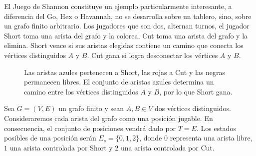 	El Juego de Shannon constituye un ejemplo particularmente interesante, a diferencia del Go, Hex o Havannah, no se desarrolla sobre un tablero, sino, sobre un grafo finito arbitrario. Los jugadores que son dos, alternan turnos, el jugador Short toma una arista del grafo y la colorea, Cut toma una arista del grafo y la elimina. Short vence si sus aristas elegidas contiene un camino que conecta los vértices distinguidos $A$ y $B$. Cut gana si logra desconectar los vértices $A$ y $B$.
	\begin{figure}[H]
		\centering
		\caption{Las aristas azules pertenecen a Short, las rojas a Cut y las negras permanecen libres. El conjunto de aristas azules determina un camino entre los vértices distinguidos $A$ y $B$, por lo que Short gana.}
	\end{figure}
	
	Sea $G=(V,E)$ un grafo finito y sean $A,B\in V$ dos vértices distinguidos. Consideraremos cada arista del grafo como una posición jugable. En consecuencia, el conjunto de posiciones vendrá dado por $T=E$. Los estados posibles de una posición serán $E_s=\{0,1,2\}$,	donde $0$ representa una arista libre, $1$ una arista controlada por Short y $2$ una arista controlada por Cut.
	
